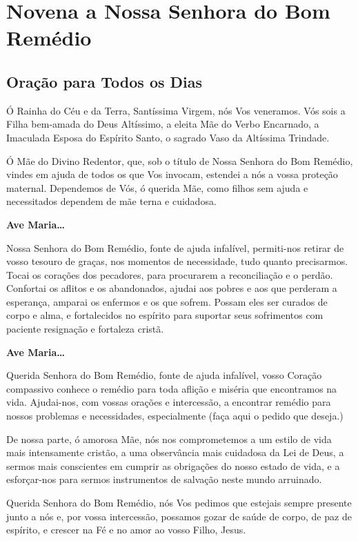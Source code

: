 \documentclass[a4paper,14pt]{extarticle} \usepackage[utf8]{inputenc}
\begin{document}
\newpage

\newpage

\section{Novena a Nossa Senhora do Bom Remédio}
\subsection*{Oração para Todos os Dias}

Ó Rainha do Céu e da Terra, Santíssima Virgem, nós Vos veneramos. Vós sois a Filha bem-amada do Deus Altíssimo, a eleita Mãe do Verbo Encarnado, a Imaculada Esposa do Espírito Santo, o sagrado Vaso da Altíssima Trindade.

Ó Mãe do Divino Redentor, que, sob o título de Nossa Senhora do Bom Remédio, vindes em ajuda de todos os que Vos invocam, estendei a nós a vossa proteção maternal. Dependemos de Vós, ó querida Mãe, como filhos sem ajuda e necessitados dependem de mãe terna e cuidadosa.

  \textbf{Ave Maria…}

Nossa Senhora do Bom Remédio, fonte de ajuda infalível, permiti-nos retirar de vosso tesouro de graças, nos momentos de necessidade, tudo quanto precisarmos. Tocai os corações dos pecadores, para procurarem a reconciliação e o perdão. Confortai os aflitos e os abandonados, ajudai aos pobres e aos que perderam a esperança, amparai os enfermos e os que sofrem. Possam eles ser curados de corpo e alma, e fortalecidos no espírito para suportar seus sofrimentos com paciente resignação e fortaleza cristã.

  \textbf{Ave Maria…}

Querida Senhora do Bom Remédio, fonte de ajuda infalível, vosso Coração compassivo conhece o remédio para toda aflição e miséria que encontramos na vida. Ajudai-nos, com vossas orações e intercessão, a encontrar remédio para nossos problemas e necessidades, especialmente (faça aqui o pedido que deseja.)

De nossa parte, ó amorosa Mãe, nós nos comprometemos a um estilo de vida mais intensamente cristão, a uma observância mais cuidadosa da Lei de Deus, a sermos mais conscientes em cumprir as obrigações do nosso estado de vida, e a esforçar-nos para sermos instrumentos de salvação neste mundo arruinado.

Querida Senhora do Bom Remédio, nós Vos pedimos que estejais sempre presente junto a nós e, por vossa intercessão, possamos gozar de saúde de corpo, de paz de espírito, e crescer na Fé e no amor ao vosso Filho, Jesus.
\end{document}

